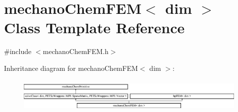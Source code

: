 \section{mechano\-Chem\-F\-E\-M$<$ dim $>$ Class Template Reference}
\label{classmechano_chem_f_e_m}


{\ttfamily \#include $<$mechano\-Chem\-F\-E\-M.\-h$>$}

Inheritance diagram for mechano\-Chem\-F\-E\-M$<$ dim $>$\-:\begin{figure}[H]
\begin{center}
\leavevmode
\includegraphics[height=1.650295cm]{classmechano_chem_f_e_m}
\end{center}
\end{figure}

